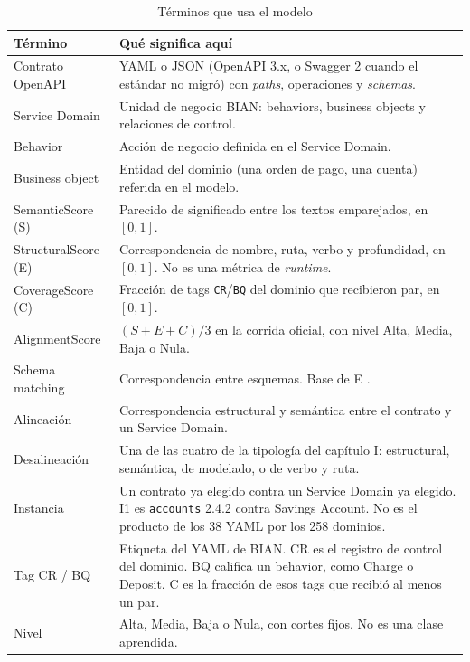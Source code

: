 \begin{table}[H]
  \centering
  \caption{Términos que usa el modelo}
  \label{tab:terminos}
  \small
  \begin{tabular}{@{}p{}p{}@{}}
    \toprule
    Término & Qué significa aquí \\
    \midrule
    Contrato OpenAPI & YAML o JSON (OpenAPI 3.x, o Swagger 2 cuando el estándar no migró) con \textit{paths}, operaciones y \textit{schemas}. \\
    Service Domain & Unidad de negocio BIAN: behaviors, business objects y relaciones de control. \\
    Behavior & Acción de negocio definida en el Service Domain. \\
    Business object & Entidad del dominio (una orden de pago, una cuenta) referida en el modelo. \\
    SemanticScore (S) & Parecido de significado entre los textos emparejados, en $[0,1]$. \\
    StructuralScore (E) & Correspondencia de nombre, ruta, verbo y profundidad, en $[0,1]$. No es una métrica de \textit{runtime}. \\
    CoverageScore (C) & Fracción de tags \texttt{CR}/\texttt{BQ} del dominio que recibieron par, en $[0,1]$. \\
    AlignmentScore & $(S+E+C)/3$ en la corrida oficial, con nivel Alta, Media, Baja o Nula. \\
    Schema matching & Correspondencia entre esquemas. Base de E \cite{Shvaiko2005}. \\
    Alineación & Correspondencia estructural y semántica entre el contrato y un Service Domain. \\
    Desalineación & Una de las cuatro de la tipología del capítulo I: estructural, semántica, de modelado, o de verbo y ruta. \\
    Instancia & Un contrato ya elegido contra un Service Domain ya elegido. I1 es \texttt{accounts} 2.4.2 contra Savings Account. No es el producto de los 38 YAML por los 258 dominios. \\
    Tag CR / BQ & Etiqueta del YAML de BIAN. CR es el registro de control del dominio. BQ califica un behavior, como Charge o Deposit. C es la fracción de esos tags que recibió al menos un par. \\
    Nivel & Alta, Media, Baja o Nula, con cortes fijos. No es una clase aprendida. \\
    \bottomrule
  \end{tabular}
\end{table}


